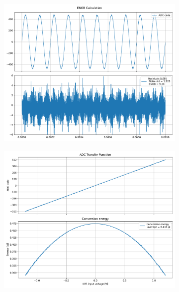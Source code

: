 \documentclass[varwidth]{standalone}
\begin{document}
\begin{figure}
\begin{subfigure}{0.32\textwidth}
    \includegraphics[width=\textwidth]{behavioral_10b_noisy_splitmsb_enob.pdf}
\end{subfigure}
\begin{subfigure}{0.32\textwidth}
    \begin{table}
    \let\center\empty
    \let\endcenter\relax
    \centering
    \resizebox{0.3\width}{!}{}
    \end{table}
    \includegraphics[width=\textwidth]{behavioral_10b_noisy_splitmsb_energy.pdf}
\end{subfigure}
\end{figure}
\end{document}
